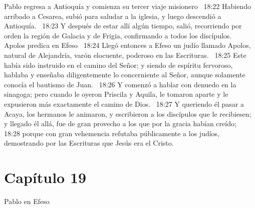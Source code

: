 Pablo regresa a Antioquía y comienza su tercer viaje misionero  
18:22 Habiendo arribado a Cesarea, subió para saludar a la iglesia, y luego descendió a Antioquía.  
18:23 Y después de estar allí algún tiempo, salió, recorriendo por orden la región de Galacia y de Frigia, confirmando a todos los discípulos.  
Apolos predica en Efeso  
18:24 Llegó entonces a Efeso un judío llamado Apolos, natural de Alejandría, varón elocuente, poderoso en las Escrituras.  
18:25 Este había sido instruido en el camino del Señor; y siendo de espíritu fervoroso, hablaba y enseñaba diligentemente lo concerniente al Señor, aunque solamente conocía el bautismo de Juan.  
18:26 Y comenzó a hablar con denuedo en la sinagoga; pero cuando le oyeron Priscila y Aquila, le tomaron aparte y le expusieron más exactamente el camino de Dios.  
18:27 Y queriendo él pasar a Acaya, los hermanos le animaron, y escribieron a los discípulos que le recibiesen; y llegado él allá, fue de gran provecho a los que por la gracia habían creído;  
18:28 porque con gran vehemencia refutaba públicamente a los judíos, demostrando por las Escrituras que Jesús era el Cristo.  
\section*{Capítulo 19 }
Pablo en Efeso  

